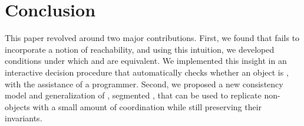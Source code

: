 \section{Conclusion}
This paper revolved around two major contributions. First, we found that
\invariantclosure{} fails to incorporate a notion of reachability, and using
this intuition, we developed conditions under which \invariantclosure{} and
\invariantconfluence{} are equivalent. We implemented this insight in an
interactive \invariantconfluence{} decision procedure that automatically checks
whether an object is \invariantconfluent{}, with the assistance of a
programmer.
%
Second, we proposed a new consistency model and generalization of
\invariantconfluence{}, segmented \invariantconfluence{}, that can be used to
replicate non-\invariantconfluent{} objects with a small amount of coordination
while still preserving their invariants.
